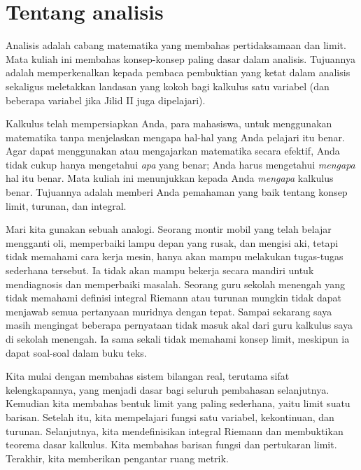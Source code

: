 
\sectionnewpage
\section{Tentang analisis} \label{sec:aboutra}

Analisis adalah cabang matematika yang membahas pertidaksamaan dan limit. Mata
kuliah ini membahas konsep-konsep paling dasar dalam analisis. Tujuannya adalah
memperkenalkan kepada pembaca pembuktian yang ketat dalam analisis sekaligus
meletakkan landasan yang kokoh bagi kalkulus satu variabel (dan beberapa
variabel jika Jilid II juga dipelajari).

Kalkulus telah mempersiapkan Anda, para mahasiswa, untuk menggunakan matematika
tanpa menjelaskan mengapa hal-hal yang Anda pelajari itu benar. Agar dapat
menggunakan atau mengajarkan matematika secara efektif, Anda tidak cukup hanya
mengetahui \emph{apa} yang benar; Anda harus mengetahui \emph{mengapa} hal itu
benar. Mata kuliah ini menunjukkan kepada Anda \emph{mengapa} kalkulus benar.
Tujuannya adalah memberi Anda pemahaman yang baik tentang konsep limit,
turunan, dan integral.

Mari kita gunakan sebuah analogi.
Seorang montir mobil yang telah belajar mengganti oli, memperbaiki lampu depan
yang rusak, dan mengisi aki, tetapi tidak memahami cara kerja mesin, hanya akan
mampu melakukan tugas-tugas sederhana tersebut. Ia tidak akan mampu bekerja
secara mandiri untuk mendiagnosis dan memperbaiki masalah. Seorang guru sekolah
menengah yang tidak memahami definisi integral Riemann atau turunan mungkin
tidak dapat menjawab semua pertanyaan muridnya dengan tepat. Sampai sekarang
saya masih mengingat beberapa pernyataan tidak masuk akal dari guru kalkulus
saya di sekolah menengah. Ia sama sekali tidak memahami konsep limit, meskipun
ia dapat  soal-soal dalam buku teks.

\medskip

Kita mulai dengan membahas sistem bilangan real, terutama sifat
kelengkapannya, yang menjadi dasar bagi seluruh pembahasan selanjutnya.
Kemudian kita membahas bentuk limit yang paling sederhana, yaitu limit suatu
barisan. Setelah itu, kita mempelajari fungsi satu variabel, kekontinuan, dan
turunan. Selanjutnya, kita mendefinisikan integral Riemann dan membuktikan
teorema dasar kalkulus. Kita membahas barisan fungsi dan pertukaran limit.
Terakhir, kita memberikan pengantar ruang metrik.

